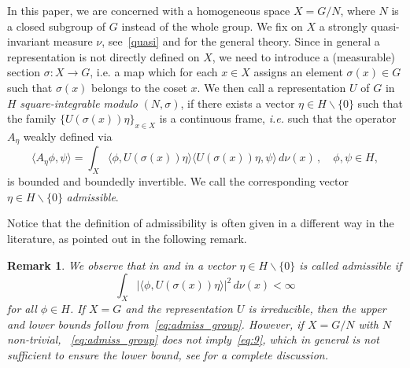 \documentclass[a4paper,11pt,DIV=11,%
abstract=on%
]{scrartcl}
\newtheorem{rem}[thm]{Remark}
\newcommand{\red}[1]{#1}
\begin{document}
In this paper, we are concerned with a homogeneous space $X = G/N$, 
where $N$ is a closed subgroup of $G$ 
instead of the whole group.  We fix
on $X$ a strongly quasi-invariant
measure $\nu$, see~\eqref{quasi} and 
\cite{folland2016course} for the
general theory. Since in general a representation is not directly defined on $X$, 
we need to introduce a (measurable) section $\sigma: X \rightarrow G$, i.e. a map which for each $x\in X$ assigns an element $\sigma(x)\in G$ such that $\sigma(x)$ belongs to the coset $x$.
We then call a representation $U$ of $G$ in $H$ \emph{square-integrable modulo} $(N,\sigma)$, if there exists
a vector $\eta\in H \backslash\{0\}$ such that 
the family
$\{U(\sigma(x))\eta\}_{x\in X}$ is a
continuous frame, {\em i.e.}  such that the operator $A_\eta$ weakly defined via
	\begin{equation}\label{eq:def-cont-frame}
		\langle A_\eta \phi,\psi\rangle
		=\int_X \langle \phi,  U\left(\sigma(x) \right)\eta \rangle \langle U\left(\sigma(x) \right)\eta,\psi\rangle\,d\nu(x)\,,
		\quad\phi,\psi\in H,
	\end{equation}
is bounded and boundedly
invertible. We call the
corresponding vector $\eta\in
H\backslash\{0\}$ \emph{admissible}.

Notice that the definition of
admissibility is often given in a
different way in the literature, as pointed out in the following remark.

\begin{rem}
\red{We observe that in \cite{AV99} and in
\cite{DST2004} a vector $\eta\in
H\backslash\{0\}$ is called \textrm{admissible} if 
\begin{equation}
\int_X\bigl|\langle\phi,U(\sigma(x))\eta\rangle\bigr|^2\,d\nu(x)<\infty\label{eq:9}
\end{equation}
for all $\phi\in H$.
If $X=G$ and the
representation $U$ is irreducible,
then the upper and lower bounds follow from~\eqref{eq:admiss_group}.
However, if $X=G/N$ with $N$
non-trivial, ~\eqref{eq:admiss_group} does not imply~\eqref{eq:9},
which in general is not sufficient to ensure the lower bound, see
\cite{fuhr2005abstract} for a
complete discussion. }
\end{rem}

	
\end{document}
